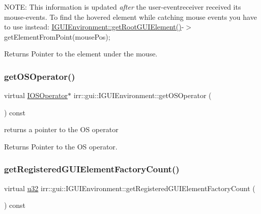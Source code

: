 N\+O\+TE\+: This information is updated {\itshape after} the user-\/eventreceiver received it\textquotesingle{}s mouse-\/events. To find the hovered element while catching mouse events you have to use instead\+: \hyperlink{classirr_1_1gui_1_1IGUIEnvironment_a35fec6d5baa9b2f65aa9ee2c336104d4}{I\+G\+U\+I\+Environment\+::get\+Root\+G\+U\+I\+Element()}-\/$>$get\+Element\+From\+Point(mouse\+Pos); \begin{DoxyReturn}{Returns}
Pointer to the element under the mouse. 
\end{DoxyReturn}
\mbox{\label{classirr_1_1gui_1_1IGUIEnvironment_afc715b9a9d98ae3aa8e769c9fb2f4f31}} 
\subsubsection{\texorpdfstring{get\+O\+S\+Operator()}{getOSOperator()}}
{\footnotesize\ttfamily virtual \hyperlink{classirr_1_1IOSOperator}{I\+O\+S\+Operator}$\ast$ irr\+::gui\+::\+I\+G\+U\+I\+Environment\+::get\+O\+S\+Operator (\begin{DoxyParamCaption}{ }\end{DoxyParamCaption}) const\hspace{0.3cm}{\ttfamily [pure virtual]}}



returns a pointer to the OS operator 

\begin{DoxyReturn}{Returns}
Pointer to the OS operator. 
\end{DoxyReturn}
\mbox{\label{classirr_1_1gui_1_1IGUIEnvironment_a022dcd144b1f955180569ef2ee844561}} 
\subsubsection{\texorpdfstring{get\+Registered\+G\+U\+I\+Element\+Factory\+Count()}{getRegisteredGUIElementFactoryCount()}}
{\footnotesize\ttfamily virtual \hyperlink{namespaceirr_a0416a53257075833e7002efd0a18e804}{u32} irr\+::gui\+::\+I\+G\+U\+I\+Environment\+::get\+Registered\+G\+U\+I\+Element\+Factory\+Count (\begin{DoxyParamCaption}{ }\end{DoxyParamCaption}) const\hspace{0.3cm}{\ttfamily [pure virtual]}}



